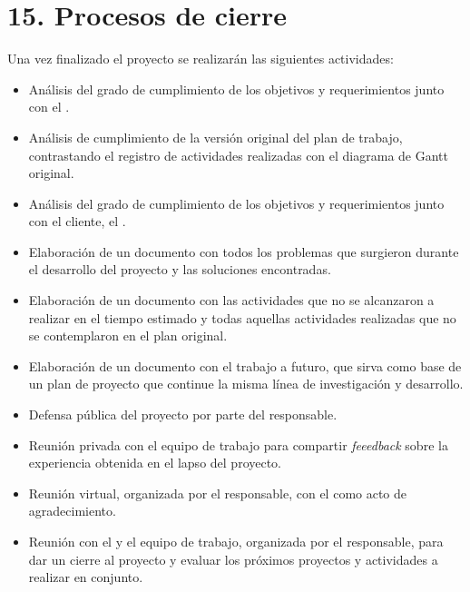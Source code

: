 \documentclass[
11pt, %
codirector, %
]{charter}
\begin{document}
\section{15. Procesos de cierre}    
\label{sec:cierre}

Una vez finalizado el proyecto se realizarán las siguientes actividades:
\begin{itemize}
	\item Análisis del grado de cumplimiento de los objetivos y requerimientos junto con el \supname{}.
	\item Análisis de cumplimiento de la versión original del plan de trabajo, contrastando el registro de actividades realizadas con el diagrama de Gantt original.
	\item Análisis del grado de cumplimiento de los objetivos y requerimientos junto con el cliente, el \clientename{}.
	\item Elaboración de un documento con todos los problemas que surgieron durante el desarrollo del proyecto y las soluciones encontradas.
	\item Elaboración de un documento con las actividades que no se alcanzaron a realizar en el tiempo estimado y todas aquellas actividades realizadas que no se contemplaron en el plan original.
	\item Elaboración de un documento con el trabajo a futuro, que sirva como base de un plan de proyecto que continue la misma línea de investigación y desarrollo.
	\item Defensa pública del proyecto por parte del responsable.
	\item Reunión privada con el equipo de trabajo para compartir \textit{feeedback} sobre la experiencia obtenida en el lapso del proyecto.
	\item Reunión virtual, organizada por el responsable, con el \supname{} como acto de agradecimiento.
	\item Reunión con el \clientename{} y el equipo de trabajo, organizada por el responsable, para dar un cierre al proyecto y evaluar los próximos proyectos y actividades a realizar en conjunto.
\end{itemize}
\end{document}
